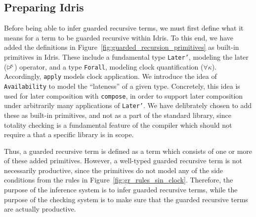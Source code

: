 \subsection{Preparing Idris}
Before being able to infer guarded recursive terms, we must first define what it
means for a term to be guarded recursive within Idris. To this end, we have
added the definitions in Figure~\ref{fig:guarded_recursion_primitives} as
built-in primitives in Idris. These include a fundamental type \texttt{Later'},
modeling the later ($\rhd^{\!\!\kappa}$) operator, and a type \texttt{Forall},
modeling clock quantification ($\forall\kappa$). Accordingly, \texttt{apply}
models clock application. We introduce the idea of \texttt{Availability} to
model the ``lateness'' of a given type. Concretely, this idea is used for later
composition with \texttt{compose}, in order to support later composition under
arbitrarily many applications of \texttt{Later'}. We have delibrately chosen to
add these as built-in primitives, and not as a part of the standard library,
since totality checking is a fundamental feature of the compiler which should
not require a that a specific library is in scope.

Thus, a guarded recursive term is defined as a term which consists of one or more of
these added primitives. However, a well-typed guarded recursive term is not
necessarily productive, since the primitives do not model any of the side
conditions from the rules in Figure~\ref{fig:gr_rules_sin_clock}. Therefore, the
purpose of the inference system is to infer guarded recursive terms, while the
purpose of the checking system is to make sure that the guarded recursive terms
are actually productive.


